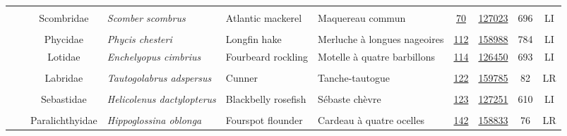 \documentclass[12pt]{article}\usepackage[]{graphicx}\usepackage[]{color}
\begin{document}
\begin{landscapepage}
\begin{longtable}[t]{ccc>{\centering\arraybackslash}p{3cm}>{\centering\arraybackslash}p{3cm}>{\centering\arraybackslash}p{3cm}>{}c>{}ccc}
\nopagebreak
\addlinespace[0.3em]
\\
\hspace{1em}\hspace{1em} &  & Scombridae & \em{Scomber scombrus} & Atlantic mackerel & Maquereau commun & \href{#sec:70}{70} & \href{http://www.marinespecies.org/aphia.php?p=taxdetails&id=127023}{127023} & 696 & LI\\
\nopagebreak
\addlinespace[0.3em]
\\
\hspace{1em}\hspace{1em} &  & Phycidae & \em{Phycis chesteri} & Longfin hake & Merluche à longues nageoires & \href{#sec:112}{112} & \href{http://www.marinespecies.org/aphia.php?p=taxdetails&id=158988}{158988} & 784 & LI\\
\nopagebreak
\hspace{1em}\hspace{1em} &  & Lotidae & \em{Enchelyopus cimbrius} & Fourbeard rockling & Motelle à quatre barbillons & \href{#sec:114}{114} & \href{http://www.marinespecies.org/aphia.php?p=taxdetails&id=126450}{126450} & 693 & LI\\
\nopagebreak
\addlinespace[0.3em]
\\
\hspace{1em}\hspace{1em} &  & Labridae & \em{Tautogolabrus adspersus} & Cunner & Tanche-tautogue & \href{#sec:122}{122} & \href{http://www.marinespecies.org/aphia.php?p=taxdetails&id=159785}{159785} & 82 & LR\\
\nopagebreak
\addlinespace[0.3em]
\\
\hspace{1em}\hspace{1em} &  & Sebastidae & \em{Helicolenus dactylopterus} & Blackbelly rosefish & Sébaste chèvre & \href{#sec:123}{123} & \href{http://www.marinespecies.org/aphia.php?p=taxdetails&id=127251}{127251} & 610 & LI\\
\nopagebreak
\addlinespace[0.3em]
\\
\hspace{1em}\hspace{1em} &  & Paralichthyidae & \em{Hippoglossina oblonga} & Fourspot flounder & Cardeau à quatre ocelles & \href{#sec:142}{142} & \href{http://www.marinespecies.org/aphia.php?p=taxdetails&id=158833}{158833} & 76 & LR\\

\end{longtable}
\end{landscapepage}
\end{document}
